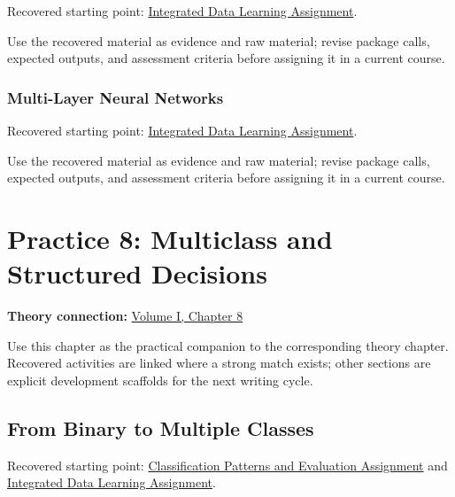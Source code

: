 \documentclass[
  letterpaper,
]{scrbook}
\begin{document}
Recovered starting point:
\hyperref[sec-lab-integrated-learning-assignment]{Integrated Data
Learning Assignment}.

Use the recovered material as evidence and raw material; revise package
calls, expected outputs, and assessment criteria before assigning it in
a current course.

\subsection*{Multi-Layer Neural
Networks}\label{sec-pr-07-multi-layer-neural-networks}

Recovered starting point:
\hyperref[sec-lab-integrated-learning-assignment]{Integrated Data
Learning Assignment}.

Use the recovered material as evidence and raw material; revise package
calls, expected outputs, and assessment criteria before assigning it in
a current course.

\chapter*{Practice 8: Multiclass and Structured
Decisions}\label{ch-practice-08}


\textbf{Theory connection:} \hyperref[ch-multiclass]{Volume I, Chapter
8}

Use this chapter as the practical companion to the corresponding theory
chapter. Recovered activities are linked where a strong match exists;
other sections are explicit development scaffolds for the next writing
cycle.

\section*{From Binary to Multiple
Classes}\label{sec-pr-08-from-binary-to-multiple-classes}


Recovered starting point:
\hyperref[sec-lab-classification-patterns-assignment]{Classification
Patterns and Evaluation Assignment} and
\hyperref[sec-lab-integrated-learning-assignment]{Integrated Data
Learning Assignment}.
\end{document}
